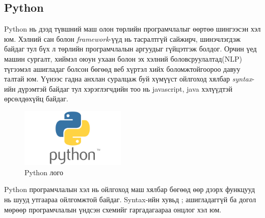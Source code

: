 \subsection{Python}
Python нь дээд түвшний маш олон төрлийн програмчлалыг өөртөө шингээсэн хэл юм. Хэлний сан болон \textit{framework}-үүд нь тасралтгүй сайжирч, шинэчлэгдэж байдаг тул бүх л төрлийн програмчлалын аргуудыг гүйцэтгэж болдог. Орчин үед машин сургалт, хиймэл оюун ухаан болон эх хэлний боловсруулалтад(NLP) түгээмэл ашигладаг болсон бөгөөд веб хүртэл хийх боломжтойгоороо давуу талтай юм. Үүнээс гадна анхлан суралцаж буй хүмүүст ойлгоход хялбар \textit{syntax}-ийн дүрэмтэй байдаг тул хэрэглэгчдийн тоо нь javascript, java хэлүүдтэй өрсөлдөхүйц байдаг. 
\begin{figure}[h]
  \centering
  \includegraphics[width=5cm]{images/pythonLogo.png}
  \caption{Python лого}
  \label{fig:pythonLogo}
\end{figure}
\newline

Python програмчлалын хэл нь ойлгоход маш хялбар бөгөөд өөр дээрх функцууд нь шууд утгаараа ойлгомжтой байдаг. Syntax-ийн хувьд ; ашигладаггүй ба догол мөрөөр програмчлалын үндсэн схемийг гаргадагаараа онцлог хэл юм. 
